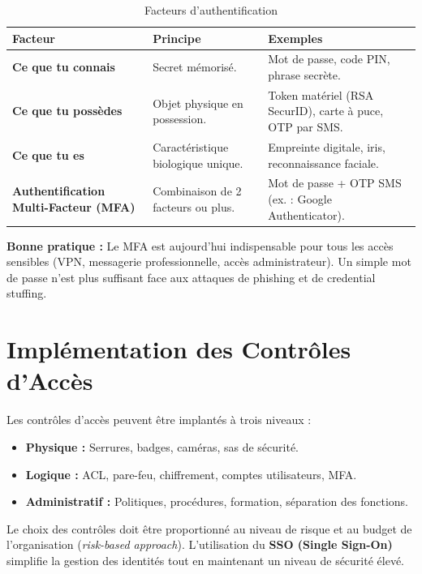 \begin{table}[H]
\centering
\begin{tabular}{p{3.5cm}p{4cm}p{4cm}}
    \toprule
    \textbf{Facteur} & \textbf{Principe} & \textbf{Exemples} \\
    \midrule
    \textbf{Ce que tu connais} & Secret mémorisé. & Mot de passe, code PIN, phrase secrète. \\
    \textbf{Ce que tu possèdes} & Objet physique en possession. & Token matériel (RSA SecurID), carte à puce, OTP par SMS. \\
    \textbf{Ce que tu es} & Caractéristique biologique unique. & Empreinte digitale, iris, reconnaissance faciale. \\
    \textbf{Authentification Multi-Facteur (MFA)} & Combinaison de 2 facteurs ou plus. & Mot de passe + OTP SMS (ex. : Google Authenticator). \\
    \bottomrule
\end{tabular}
\caption{Facteurs d'authentification}
\end{table}

\begin{boxalert}
\textbf{Bonne pratique :} Le MFA est aujourd'hui indispensable pour tous les accès sensibles (VPN, messagerie professionnelle, accès administrateur). Un simple mot de passe n'est plus suffisant face aux attaques de phishing et de credential stuffing.
\end{boxalert}

\section{Implémentation des Contrôles d'Accès}

Les contrôles d'accès peuvent être implantés à trois niveaux :
\begin{itemize}
    \item \textbf{Physique :} Serrures, badges, caméras, sas de sécurité.
    \item \textbf{Logique :} ACL, pare-feu, chiffrement, comptes utilisateurs, MFA.
    \item \textbf{Administratif :} Politiques, procédures, formation, séparation des fonctions.
\end{itemize}

Le choix des contrôles doit être proportionné au niveau de risque et au budget de l'organisation (\textit{risk-based approach}). L'utilisation du \textbf{SSO (Single Sign-On)} simplifie la gestion des identités tout en maintenant un niveau de sécurité élevé.

